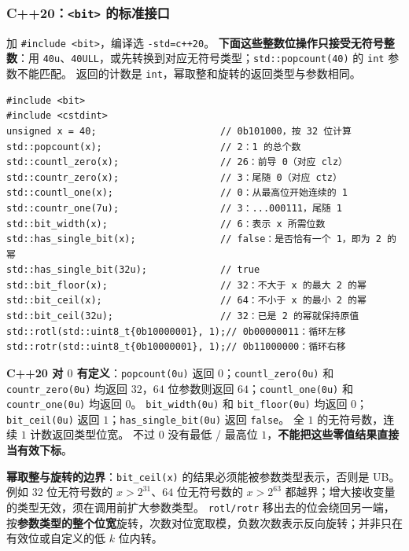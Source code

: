 \subsubsection{C++20：\texorpdfstring{\texttt{<bit>}}{<bit>} 的标准接口}

加 \texttt{\#include <bit>}，编译选 \texttt{-std=c++20}。
\textbf{下面这些整数位操作只接受无符号整数}：用 \texttt{40u}、\texttt{40ULL}，或先转换到对应无符号类型；\texttt{std::popcount(40)} 的 \texttt{int} 参数不能匹配。
返回的计数是 \texttt{int}，幂取整和旋转的返回类型与参数相同。

\begin{verbatim}
#include <bit>
#include <cstdint>
unsigned x = 40;                      // 0b101000，按 32 位计算
std::popcount(x);                     // 2：1 的总个数
std::countl_zero(x);                  // 26：前导 0（对应 clz）
std::countr_zero(x);                  // 3：尾随 0（对应 ctz）
std::countl_one(x);                   // 0：从最高位开始连续的 1
std::countr_one(7u);                  // 3：...000111，尾随 1
std::bit_width(x);                    // 6：表示 x 所需位数
std::has_single_bit(x);               // false：是否恰有一个 1，即为 2 的幂
std::has_single_bit(32u);             // true
std::bit_floor(x);                    // 32：不大于 x 的最大 2 的幂
std::bit_ceil(x);                     // 64：不小于 x 的最小 2 的幂
std::bit_ceil(32u);                   // 32：已是 2 的幂就保持原值
std::rotl(std::uint8_t{0b10000001}, 1);// 0b00000011：循环左移
std::rotr(std::uint8_t{0b10000001}, 1);// 0b11000000：循环右移
\end{verbatim}

\textbf{C++20 对 $0$ 有定义}：\texttt{popcount(0u)} 返回 $0$；\texttt{countl\_zero(0u)} 和 \texttt{countr\_zero(0u)} 均返回 $32$，$64$ 位参数则返回 $64$；\texttt{countl\_one(0u)} 和 \texttt{countr\_one(0u)} 均返回 $0$。
\texttt{bit\_width(0u)} 和 \texttt{bit\_floor(0u)} 均返回 $0$；\texttt{bit\_ceil(0u)} 返回 $1$；\texttt{has\_single\_bit(0u)} 返回 \texttt{false}。
全 $1$ 的无符号数，连续 $1$ 计数返回类型位宽。
不过 $0$ 没有最低 / 最高位 $1$，\textbf{不能把这些零值结果直接当有效下标}。

\textbf{幂取整与旋转的边界}：\texttt{bit\_ceil(x)} 的结果必须能被参数类型表示，否则是 UB。
例如 $32$ 位无符号数的 $x>2^{31}$、$64$ 位无符号数的 $x>2^{63}$ 都越界；增大接收变量的类型无效，须在调用前扩大参数类型。
\texttt{rotl/rotr} 移出去的位会绕回另一端，按\textbf{参数类型的整个位宽}旋转，次数对位宽取模，负数次数表示反向旋转；并非只在有效位或自定义的低 $k$ 位内转。

